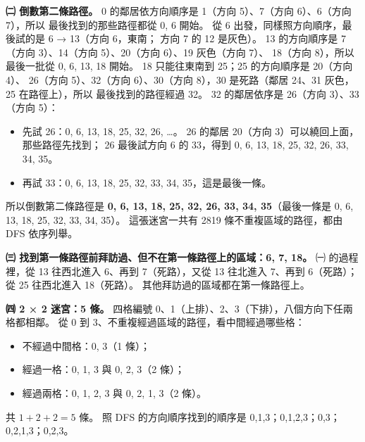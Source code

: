 \begin{pastsoln}
\textbf{㈡ 倒數第二條路徑。} 0 的鄰居依方向順序是 1（方向 5）、7（方向 6）、6（方向 7），所以
最後找到的那些路徑都從 0, 6 開始。 從 6 出發，同樣照方向順序，最後試的是 6 → 13（方向 6，東南；
方向 7 的 12 是灰色）。 13 的方向順序是 7（方向 3）、14（方向 5）、20（方向 6）、19 灰色（方向 7）、
18（方向 8），所以最後一批從 0, 6, 13, 18 開始。 18 只能往東南到 25；25 的方向順序是 20（方向 4）、
26（方向 5）、32（方向 6）、30（方向 8），30 是死路（鄰居 24、31 灰色，25 在路徑上），所以
最後找到的路徑經過 32。 32 的鄰居依序是 26（方向 3）、33（方向 5）：
\begin{itemize}
\item 先試 26：0, 6, 13, 18, 25, 32, 26, \dots。 26 的鄰居 20（方向 3）可以繞回上面，那些路徑先找到；
26 最後試方向 6 的 33，得到 0, 6, 13, 18, 25, 32, 26, 33, 34, 35。
\item 再試 33：0, 6, 13, 18, 25, 32, 33, 34, 35，這是最後一條。
\end{itemize}
所以倒數第二條路徑是 \textbf{0, 6, 13, 18, 25, 32, 26, 33, 34, 35}（最後一條是
0, 6, 13, 18, 25, 32, 33, 34, 35）。 這張迷宮一共有 2819 條不重複區域的路徑，都由 DFS 依序列舉。

\textbf{㈢ 找到第一條路徑前拜訪過、但不在第一條路徑上的區域：6, 7, 18。} ㈠ 的過程裡，從 13
往西北進入 6、再到 7（死路），又從 13 往北進入 7、再到 6（死路）；從 25 往西北進入 18（死路）。
其他拜訪過的區域都在第一條路徑上。

\textbf{㈣ 2 × 2 迷宮：5 條。} 四格編號 0、1（上排）、2、3（下排），八個方向下任兩格都相鄰。
從 0 到 3、不重複經過區域的路徑，看中間經過哪些格：
\begin{itemize}
\item 不經過中間格：0, 3（1 條）；
\item 經過一格：0, 1, 3 與 0, 2, 3（2 條）；
\item 經過兩格：0, 1, 2, 3 與 0, 2, 1, 3（2 條）。
\end{itemize}
共 $1 + 2 + 2 = 5$ 條。 照 DFS 的方向順序找到的順序是 0,1,3；0,1,2,3；0,3；0,2,1,3；0,2,3。
\end{pastsoln}
